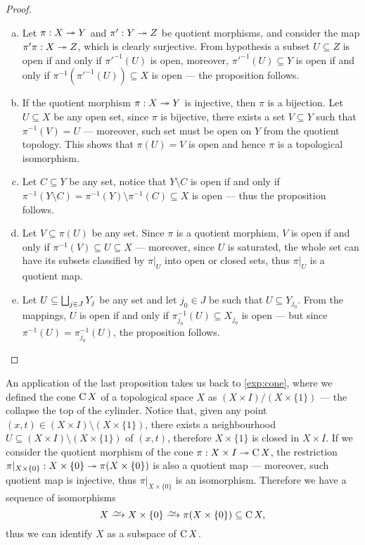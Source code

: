 \begin{proof}
\begin{enumerate}[(a)]\setlength\itemsep{0em}
\item Let \(\pi: X \twoheadrightarrow Y\) and \(\pi': Y \twoheadrightarrow Z\) be quotient morphisms, and
  consider the map \(\pi' \pi: X \twoheadrightarrow Z\), which is clearly surjective. From
  hypothesis a subset \(U \subseteq Z\) is open if and only if \(\pi'^{-1}(U)\)
  is open, moreover, \(\pi'^{-1}(U) \subseteq Y\) is open if and only if
  \(\pi^{-1}(\pi'^{-1}(U)) \subseteq X\) is open --- the proposition follows.
\item If the quotient morphism \(\pi: X \twoheadrightarrow Y\) is injective, then \(\pi\) is a
  bijection. Let \(U \subseteq X\) be any open set, since \(\pi\) is bijective,
  there exists a set \(V \subseteq Y\) such that \(\pi^{-1}(V) = U\) ---
  moreover, such set must be open on \(Y\) from the quotient topology. This
  shows that \(\pi(U) = V\) is open and hence \(\pi\) is a topological
  isomorphism.
\item Let \(C \subseteq Y\) be any set, notice that \(Y \setminus C\) is open
  if and only if \(\pi^{-1}(Y \setminus C) = \pi^{-1}(Y) \setminus \pi^{-1}(C)
  \subseteq X\) is open --- thus the proposition follows.
\item Let \(V \subseteq \pi(U)\) be any set. Since \(\pi\) is a quotient
  morphism, \(V\) is open if and only if \(\pi^{-1}(V) \subseteq U \subseteq
  X\) --- moreover, since \(U\) is saturated, the whole set can have its subsets
  classified by \(\pi|_U\) into open or closed sets, thus \(\pi|_U\) is a
  quotient map.
\item Let \(U \subseteq \bigsqcup_{j \in J} Y_j\) be any set and let \(j_{0} \in
  J\) be such that \(U \subseteq Y_{j_0}\). From the mappings, \(U\) is open if
  and only if \(\pi^{-1}_{j_0}(U) \subseteq X_{j_0}\) is open --- but since
  \(\pi^{-1}(U) = \pi^{-1}_{j_0}(U)\), the proposition follows.
\end{enumerate}
\end{proof}

\begin{example}[Cones]
\label{exp:remove-section-cone-isomorphism}
An application of the last proposition takes us back to \cref{exp:cone}, where
we defined the cone \(\operatorname{C} X\) of a topological space \(X\) as \((X \times I) /
(X \times \{1\})\) --- the collapse the top of the cylinder. Notice that, given
any point \((x, t) \in (X \times I) \setminus (X \times \{1\})\), there exists a
neighbourhood \(U \subseteq (X \times I) \setminus (X \times \{1\})\) of \((x,
t)\), therefore \(X \times \{1\}\) is closed in \(X \times I\). If we consider
the quotient morphism of the cone \(\pi: X \times I \twoheadrightarrow \operatorname{C} X\), the
restriction \(\pi|_{X \times \{0\}}: X \times \{0\} \twoheadrightarrow \pi(X \times \{0\})\)
is also a quotient map --- moreover, such quotient map is injective, thus
\(\pi|_{X \times \{0\}}\) is an isomorphism. Therefore we have a sequence of
isomorphisms
\[
  X \isoto X \times \{0\} \isoto \pi(X \times \{0\}) \subseteq \Cone X,
\]
thus we can identify \(X\) as a subspace of \(\operatorname{C} X\).
\end{example}

